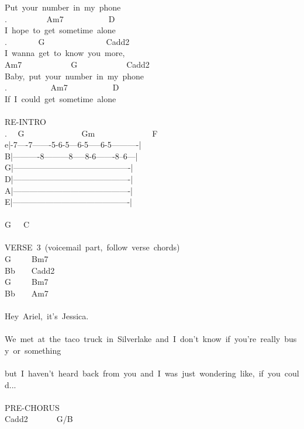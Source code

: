{Put\ your\ number\ in\ my\ phone\\
. \ \ \ \ \ \ \ \ \ Am7\ \ \ \ \ \ \ \ \ \ \ D\\
I\ hope\ to\ get\ sometime\ alone\\
. \ \ \ \ \ \ \ G\ \ \ \ \ \ \ \ \ \ \ \ \ \ \ Cadd2\\
I\ wanna\ get\ to\ know\ you\ more,\ \\
Am7\ \ \ \ \ \ \ \ \ \ \ \ G\ \ \ \ \ \ \ \ \ \ \ \ Cadd2\\
Baby,\ put\ your\ number\ in\ my\ phone\\
. \ \ \ \ \ \ \ \ \ \ Am7\ \ \ \ \ \ \ \ \ \ \ D\\
If\ I\ could\ get\ sometime\ alone\\
\\
RE-INTRO\\
. \ \ G\ \ \ \ \ \ \ \ \ \ \ \ \ \ Gm\ \ \ \ \ \ \ \ \ \ \ \ \ \ F\\
e|-7----7-------5-6-5---6-5-----6-5----------|\\
B|----------8---------8-----8-6-------8--6---|\\
G|-------------------------------------------|\\
D|-------------------------------------------|\\
A|-------------------------------------------|\\
E|-------------------------------------------|\\
\\
G\ \ \ C\\
\\
VERSE\ 3\ (voicemail\ part,\ follow\ verse\ chords)\\
G\ \ \ \ \ Bm7\\
Bb\ \ \ \ Cadd2\\
G\ \ \ \ \ Bm7\\
Bb\ \ \ \ Am7\\
\\
Hey\ Ariel,\ it's\ Jessica.\ \\
\\
We\ met\ at\ the\ taco\ truck\ in\ Silverlake\ and\ I\ don't\ know\ if\ you're\ really\ busy\ or\ something\ \\
\\
but\ I\ haven't\ heard\ back\ from\ you\ and\ I\ was\ just\ wondering\ like,\ if\ you\ could...\\
\\
PRE-CHORUS\\
Cadd2\ \ \ \ \ \ \ G/B\\
}
